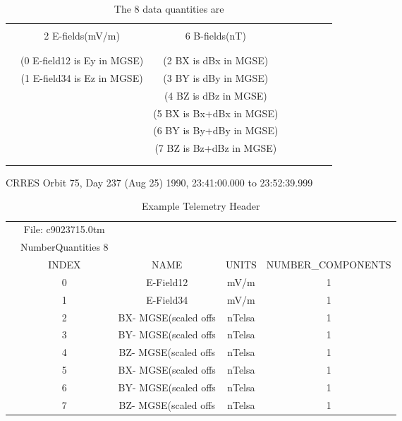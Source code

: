 \\
\newpage
\begin{table}
\begin{center}
\caption{The 8 data quantities are}
\begin{tabular}{lccccccc}  
\hline
&\\
&2 E-fields(mV/m)		 	&6 B-fields(nT)\\
&\\
\hline
&\\
&(0 E-field12 is Ey in MGSE)		&(2   BX is dBx in MGSE)\\

&(1 E-field34 is Ez in MGSE)		&(3   BY is dBy in MGSE)\\

					&&(4   BZ is dBz in MGSE)\\							

					&&(5   BX is Bx+dBx in MGSE)\\

					&&(6   BY is By+dBy in MGSE)\\

					&&(7   BZ is Bz+dBz in MGSE)\\
&\\
\hline
&\\
\end{tabular}  
\end{center}
\end{table}

\begin{table}
\begin{center}
\caption{Example Telemetry Header}
CRRES Orbit 75, Day 237 (Aug 25) 1990, 23:41:00.000 to 23:52:39.999\\
\begin{tabular}{lcccc}
&File:  c9023715.0tm\\
&NumberQuantities  8\\
&INDEX  &NAME                      &UNITS         &NUMBER\_COMPONENTS\\
&0   &E-Field12                 &mV/m          &1\\
&1   &E-Field34                 &mV/m          &1\\
&2   &BX- MGSE\n(scaled  offs  &nTelsa        &1\\
&3   &BY- MGSE\n(scaled  offs  &nTelsa        &1\\
&4   &BZ- MGSE\n(scaled  offs  &nTelsa        &1\\
&5   &BX- MGSE\n(scaled  offs  &nTelsa        &1\\
&6   &BY- MGSE\n(scaled  offs  &nTelsa        &1\\
&7   &BZ- MGSE\n(scaled  offs  &nTelsa        &1\\
\end{tabular}  
\end{center}
\end{table}

